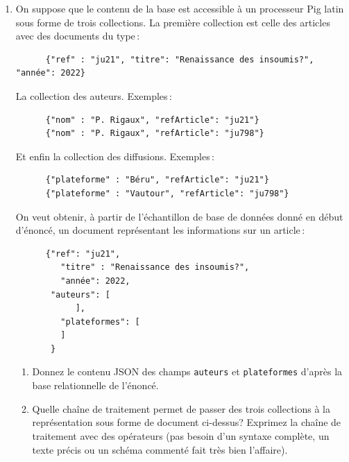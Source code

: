 \documentclass[11pt,a4paper]{article}
\begin{document}
\begin{enumerate}
  \item On suppose que le contenu de la base  est accessible à un processeur
    Pig latin sous forme de trois collections. La première collection est celle
    des articles avec des documents du type\,:
    \begin{small}
    \begin{verbatim}
      {"ref" : "ju21", "titre": "Renaissance des insoumis?", "année": 2022}
    \end{verbatim}
    \end{small}
    La collection des auteurs. Exemples\,:
    \begin{small}
        \begin{verbatim}
      {"nom" : "P. Rigaux", "refArticle": "ju21"}
      {"nom" : "P. Rigaux", "refArticle": "ju798"}
    \end{verbatim}
    \end{small}
    Et enfin la collection des diffusions. Exemples\,:
    \begin{small}
     \begin{verbatim}
      {"plateforme" : "Béru", "refArticle": "ju21"}
      {"plateforme" : "Vautour", "refArticle": "ju798"}
    \end{verbatim}
    \end{small}
     
    On veut obtenir, à partir 
    de l'échantillon de base de données donné en début d'énoncé, un document
    représentant les informations sur un article\,:

    
    \begin{small}
    \begin{verbatim}
      {"ref": "ju21",
         "titre" : "Renaissance des insoumis?",
         "année": 2022,
       "auteurs": [
            ],
         "plateformes": [
         ]
       }
    \end{verbatim}
    \end{small}
    
    
    \begin{enumerate}
      \item Donnez le contenu JSON des champs \texttt{auteurs} et \texttt{plateformes}
          d'après la base relationnelle de l'énoncé.
          
     \item Quelle chaîne de traitement permet de passer des trois collections
         à la représentation sous forme de document ci-dessus? Exprimez 
         la chaîne de traitement avec des opérateurs (pas besoin d'un syntaxe complète,
         un texte précis ou un schéma commenté
         fait très bien l'affaire).
      

\end{enumerate}
\end{enumerate}
\end{document}
